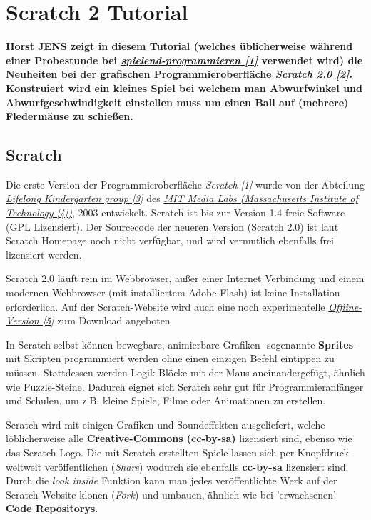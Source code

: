 \section*{Scratch 2 Tutorial}
\label{scratch}

\textbf{Horst JENS zeigt in diesem Tutorial (welches üblicherweise während einer Probestunde bei \href{http://spielend-programmieren.at}{\textit{spielend-programmieren [1]}} verwendet wird) die Neuheiten bei der grafischen Programmieroberfläche \href{http://scratch.mit.ed}{\textit{Scratch 2.0 [2]}}. Konstruiert wird ein kleines Spiel bei welchem man Abwurfwinkel und Abwurfgeschwindigkeit einstellen muss um einen Ball auf (mehrere) Fledermäuse zu schießen.}

\subsection*{Scratch}

Die erste Version der Programmieroberfläche \textit{Scratch [1]} wurde von der Abteilung \href{http://llk.media.mit.edu/}{\textit{Lifelong Kindergarten group [3]}} des \href{http://www.media.mit.edu/}{\textit{MIT Media Labs (Massachusetts Institute of Technology [4])}},  2003 entwickelt. Scratch ist bis zur Version 1.4 freie Software (GPL Lizensiert). Der Sourcecode der neueren Version (Scratch 2.0) ist laut Scratch Homepage noch nicht verfügbar, und wird vermutlich ebenfalls frei lizensiert werden. 

Scratch 2.0 läuft rein im Webbrowser, außer einer Internet Verbindung und einem modernen Webbrowser (mit installiertem Adobe Flash) ist keine Installation erforderlich. Auf der Scratch-Website wird auch eine noch experimentelle \href{http://scratch.mit.edu/scratch2download/}{\textit{Offline-Version [5]}} zum Download angeboten

In Scratch selbst können bewegbare, animierbare Grafiken -sogenannte \textbf{Sprites}- mit Skripten programmiert werden ohne einen einzigen Befehl eintippen zu müssen. Stattdessen werden Logik-Blöcke mit der Maus aneinandergefügt, ähnlich wie Puzzle-Steine. Dadurch eignet sich Scratch sehr gut für Programmieranfänger und Schulen, um z.B. kleine Spiele, Filme oder Animationen zu erstellen. 

Scratch wird mit einigen Grafiken und Soundeffekten ausgeliefert, welche löblicherweise alle \textbf{Creative-Commons (cc-by-sa)} lizensiert sind, ebenso wie das Scratch Logo. Die mit Scratch erstellten Spiele lassen sich per Knopfdruck weltweit veröffentlichen (\textit{Share}) wodurch sie ebenfalls \textbf{cc-by-sa} lizensiert sind. Durch die \textit{look inside} Funktion kann man jedes veröffentlichte Werk auf der Scratch Website klonen (\textit{Fork}) und umbauen, ähnlich wie bei 'erwachsenen' \textbf{Code Repositorys}.


